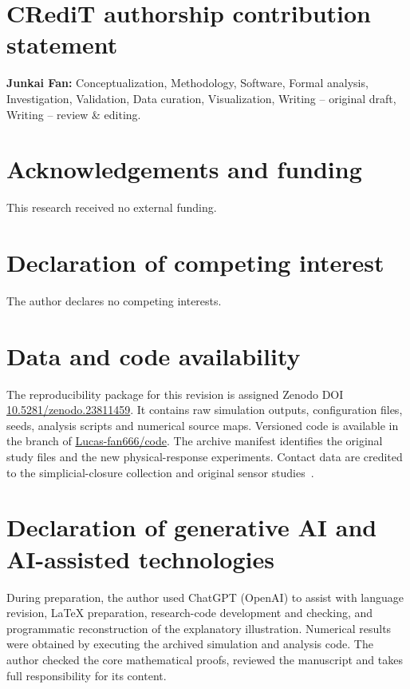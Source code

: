 \documentclass[final,5p,times,twocolumn,sort&compress]{elsarticle}
\theoremstyle{plain}
\begin{document}
\section*{CRediT authorship contribution statement}
\textbf{Junkai Fan:} Conceptualization, Methodology, Software, Formal analysis, Investigation, Validation, Data curation, Visualization, Writing -- original draft, Writing -- review \& editing.
\section*{Acknowledgements and funding}
This research received no external funding.
\section*{Declaration of competing interest}
The author declares no competing interests.
\section*{Data and code availability}
The reproducibility package for this revision is assigned Zenodo DOI \href{https://doi.org/10.5281/zenodo.23811459}{10.5281/zenodo.23811459}. It contains raw simulation outputs, configuration files, seeds, analysis scripts and numerical source maps. Versioned code is available in the  branch of \href{https://github.com/Lucas-fan666/code/tree/physicaA-editorial-20261031}{Lucas-fan666/code}. The archive manifest identifies the original study files and the new physical-response experiments. Contact data are credited to the simplicial-closure collection and original sensor studies~\cite{benson2018,highschool2015,primaryschool2011}.
\section*{Declaration of generative AI and AI-assisted technologies}
During preparation, the author used ChatGPT (OpenAI) to assist with language revision, LaTeX preparation, research-code development and checking, and programmatic reconstruction of the explanatory illustration. Numerical results were obtained by executing the archived simulation and analysis code. The author checked the core mathematical proofs, reviewed the manuscript and takes full responsibility for its content.
\begingroup
{}
\renewcommand{\bibfont}{\footnotesize}\setlength{\bibsep}{0pt}


\endgroup
\end{document}
